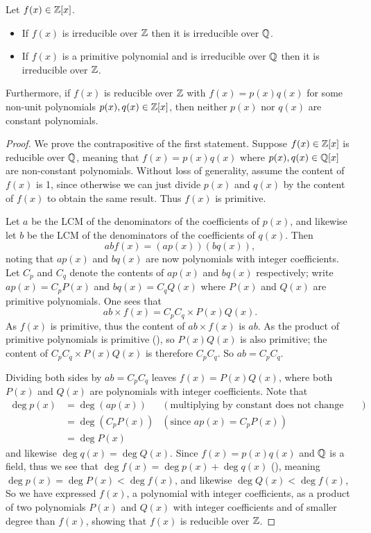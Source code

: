 \begin{theorem}\label{thrm-irreducible-over-Z-means-irreducible-over-Q}
    Let $f(x) \in \mathbb{Z}[x]$.
    \begin{itemize}
        \item If $f(x)$ is irreducible over $\mathbb{Z}$ then it is irreducible over $\mathbb{Q}$.
        \item If $f(x)$ is a primitive polynomial and is irreducible over $\mathbb{Q}$ then it is irreducible over $\mathbb{Z}$.
    \end{itemize}
    Furthermore, if $f(x)$ is reducible over $\mathbb{Z}$ with $f(x) = p(x)q(x)$ for some non-unit polynomials $p(x), q(x) \in \mathbb{Z}[x]$, then neither $p(x)$ nor $q(x)$ are constant polynomials.
\end{theorem}
\begin{proof}
    We prove the contrapositive of the first statement. Suppose $f(x) \in \mathbb{Z}[x]$ is reducible over $\mathbb{Q}$, meaning that $f(x) = p(x)q(x)$ where $p(x), q(x) \in \mathbb{Q}[x]$ are non-constant polynomials. Without loss of generality, assume the content of $f(x)$ is 1, since otherwise we can just divide $p(x)$ and $q(x)$ by the content of $f(x)$ to obtain the same result. Thus $f(x)$ is primitive.

    Let $a$ be the LCM of the denominators of the coefficients of $p(x)$, and likewise let $b$ be the LCM of the denominators of the coefficients of $q(x)$. Then
    \[
        abf(x) = (ap(x))(bq(x)),
    \]
    noting that $ap(x)$ and $bq(x)$ are now polynomials with integer coefficients. Let $C_p$ and $C_q$ denote the contents of $ap(x)$ and $bq(x)$ respectively; write $ap(x) = C_pP(x)$ and $bq(x) = C_qQ(x)$ where $P(x)$ and $Q(x)$ are primitive polynomials. One sees that
    \[
        ab \times f(x) = C_pC_q \times P(x)Q(x).
    \]
    As $f(x)$ is primitive, thus the content of $ab \times f(x)$ is $ab$. As the product of primitive polynomials is primitive (), so $P(x)Q(x)$ is also primitive; the content of $C_pC_q \times P(x)Q(x)$ is therefore $C_pC_q$. So $ab = C_pC_q$.

    Dividing both sides by $ab = C_pC_q$ leaves $f(x) = P(x)Q(x)$, where both $P(x)$ and $Q(x)$ are polynomials with integer coefficients. Note that
    \begin{align*}
        \deg p(x) &= \deg (ap(x)) & (\text{multiplying by constant does not change degree})\\
        &= \deg(C_pP(x)) & (\text{since } ap(x) = C_pP(x))\\
        &= \deg P(x)
    \end{align*}
    and likewise $\deg q(x) = \deg Q(x)$. Since $f(x) = p(x)q(x)$ and $\mathbb{Q}$ is a field, thus we see that $\deg f(x) = \deg p(x) + \deg q(x)$ (), meaning $\deg p(x) = \deg P(x) < \deg f(x)$, and likewise $\deg Q(x) < \deg f(x)$, So we have expressed $f(x)$, a polynomial with integer coefficients, as a product of two polynomials $P(x)$ and $Q(x)$ with integer coefficients and of smaller degree than $f(x)$, showing that $f(x)$ is reducible over $\mathbb{Z}$.


\end{proof}
